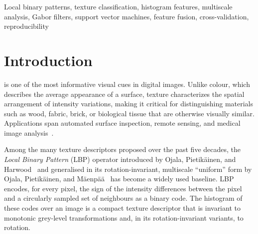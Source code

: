 \documentclass[conference]{IEEEtran}
\begin{document}
\begin{IEEEkeywords}
Local binary patterns, texture classification, histogram features,
multiscale analysis, Gabor filters, support vector machines, feature fusion,
cross-validation, reproducibility
\end{IEEEkeywords}

\section{Introduction}
 is one of the most informative visual cues in
digital images. Unlike colour, which describes the average appearance of a
surface, texture characterizes the spatial arrangement of intensity
variations, making it critical for distinguishing materials such as wood,
fabric, brick, or biological tissue that are otherwise visually similar.
Applications span automated surface inspection, remote sensing, and
medical image analysis~\cite{liu2019bowcnn}.

Among the many texture descriptors proposed over the past five decades,
the \emph{Local Binary Pattern} (LBP) operator introduced by Ojala,
Pietik\"{a}inen, and Harwood~\cite{ojala1996comparative} and generalised in
its rotation-invariant, multiscale ``uniform'' form by Ojala,
Pietik\"{a}inen, and M\"{a}enp\"{a}\"{a}~\cite{ojala2002multiresolution} has
become a widely used baseline. LBP encodes, for every pixel, the sign of
the intensity differences between the pixel and a circularly sampled set of
neighbours as a binary code. The histogram of these codes over an image is
a compact texture descriptor that is invariant to monotonic grey-level
transformations and, in its rotation-invariant variants, to rotation.
\end{document}
